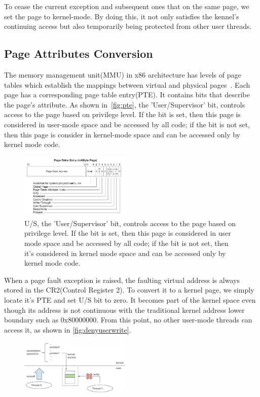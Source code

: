 To cease the current exception and subsequent ones that on the same page, we set the page to kernel-mode. By doing this, it not only satisfies the kennel's continuing access but also temporarily being protected from other user threads.


\subsection{Page Attributes Conversion}


The memory management unit(MMU) in x86 architecture has levels of page tables which establish the mappings between virtual and physical pages~\cite{intelpaging}. Each page has a corresponding page table entry(PTE). It contains bits that describe the page's attribute. As shown in~\autoref{fig:pte}, the 'User/Supervisor' bit, controls access to the page based on privilege level. If the bit is set, then this page is considered in user-mode space and be accessed by all code; if the bit is not set, then this page is consider in kernel-mode space and can be accessed only by kernel mode code.


\begin{figure}[th]
  \includegraphics[width=0.47\textwidth]{figures/pte}
  \centering
  \caption{U/S, the 'User/Supervisor' bit, controls access to the page based on privilege level. If the bit is set, then this page is considered in user mode space and be accessed by all code; if the bit is not set, then it's considered in kernel mode space and can be accessed only by kernel mode code. }
  \label{fig:pte}
\end{figure}


When a page fault exception is raised, the faulting virtual address is always stored in the CR2(Control Register 2). To convert it to a kernel page, we simply locate it's PTE and set U/S bit to zero. It becomes part of the kernel space even though its address is not continuous with the traditional kernel address lower boundary such as 0x80000000. From this point, no other user-mode threads can access it, as shown in \autoref{fig:denyuserwrite}.

\begin{figure}[th]
  \includegraphics[width=0.47\textwidth]{figures/denyuserwrite}
  \centering
  \caption{}
  \label{fig:denyuserwrite}
\end{figure}

